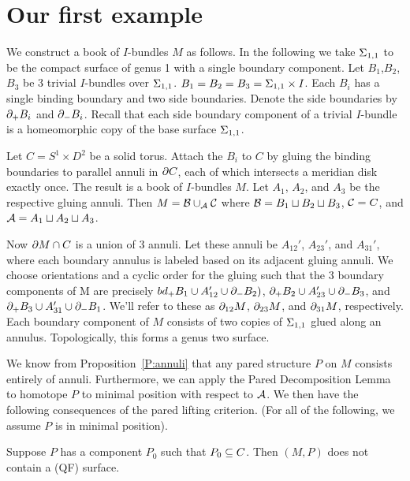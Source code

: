 \section{Our first example}

We construct a book of $I$-bundles $M$ as follows. In the following we take
$\Sigma_{1,1}$ to be the compact surface of genus 1 with a single boundary
component. Let $B_1$,$B_2$,$B_3$ be 3 trivial $I$-bundles over $\Sigma_{1,1}$.
$B_1=B_2=B_3=\Sigma_{1,1}\times I$. Each $B_i$ has a single binding boundary and two
side boundaries. Denote the side boundaries by $\partial_+B_i$ and $\partial_-B_i$.
Recall that each side boundary component of a trivial $I$-bundle is
a homeomorphic copy of the base surface $\Sigma_{1,1}$.

Let $C = S^1\times D^2$ be a solid torus. Attach the $B_i$ to $C$ by gluing the
binding boundaries to parallel annuli in $\partial C$, each of which intersects
a meridian disk exactly once. The result is a book of $I$-bundles $M$. Let
$A_1$, $A_2$, and $A_3$ be the respective gluing annuli. Then $M=\mathcal{B}\cup_{\mathcal{A}}
\mathcal{C}$ where $\mathcal{B}=B_1 \sqcup B_2 \sqcup B_3$, $\mathcal{C}=C$, and $\mathcal{A} = A_1 \sqcup A_2
\sqcup A_3$.

Now $\partial M \cap C$ is a union of 3 annuli. Let these annuli be $A_{12}'$,
$A_{23}'$, and $A_{31}'$, where each boundary annulus is labeled based on its
adjacent gluing annuli. We choose orientations and a cyclic order for the
gluing such that the 3 boundary components of M are precisely $bd_+B_1 \cup
A_{12}' \cup \partial_-B_2)$, $\partial_+B_2 \cup A_{23}' \cup \partial_-B_3$, and $\partial_+B_3
\cup A_{31}' \cup \partial_-B_1$. We'll refer to these as $\partial_{12}M$, $\partial_{23}M$,
and $\partial_{31}M$, respectively.  Each boundary component of $M$ consists of two
copies of $\Sigma_{1,1}$ glued along an annulus. Topologically, this forms a genus
two surface.

We know from Proposition~\ref{P:annuli} that any pared structure $P$ on $M$
consists entirely of annuli. Furthermore, we can apply the Pared Decomposition
Lemma to homotope $P$ to minimal position with respect to $\mathcal{A}$. We then have
the following consequences of the pared lifting criterion. (For all of the
following, we assume $P$ is in minimal position).

\begin{prop}

Suppose $P$ has a component $P_0$ such that $P_0 \subseteq C$. Then $(M,P)$ does not
contain a (QF) surface.

\end{prop}

